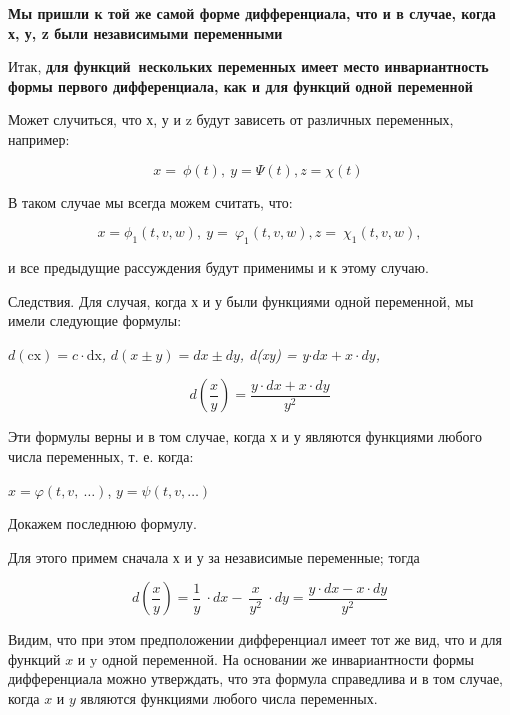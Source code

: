 \textbf{Мы пришли к той же самой форме дифференциала, что и в случае,
когда х, у, z были независимыми переменными}

Итак, \textbf{для функций~нескольких переменных имеет место
инвариантность формы первого дифференциала, как и для функций одной
переменной}

Может случиться, что х, у и z будут зависеть от различных переменных,
например:

$$ x = \ \phi\left( t \right),\ y = \Psi\left( t \right),z = \chi(t)\  $$

В таком случае мы всегда можем считать, что:

$$ x = \phi_{1}\left( t,v,w \right),\ {y = \ \varphi}_{1}\left( t,v,w \right),{z = \ \chi}_{1}\left( t,v,w \right), $$

и все предыдущие рассуждения будут применимы и к этому случаю.

Следствия. Для случая, когда х и у были функциями одной переменной, мы
имели следующие формулы:

$ d\left( \text{cx} \right) = c \cdot \text{dx} $\emph{,}
$ d\left( x \pm y \right) = dx \pm dy $\emph{, d(xy) =
y}$ \cdot dx + x \cdot dy $\emph{,}

$$ d\left( \frac{x}{y} \right) = \frac{y \cdot dx + x \cdot dy}{y^{2}} $$

Эти формулы верны и в том случае, когда х и у являются функциями любого
числа переменных, т. е. когда:

$ x = \varphi(t,v,\ \ldots) $, $ y = \psi(t,v,\ldots) $

Докажем последнюю формулу.

Для этого примем сначала х и у за независимые переменные; тогда

$$ d\left( \frac{x}{y} \right) = \frac{1}{y}\  \cdot dx - \ \frac{x}{y^{2}}\  \cdot dy = \frac{y \cdot dx - x \cdot dy}{y^{2}} $$

Видим, что при этом предположении дифференциал имеет тот же вид, что и
для функций $ x $ и $ \text{y\ } $одной переменной. На основании же
инвариантности формы дифференциала можно утверждать, что эта формула
справедлива и в том случае, когда $ x $ и $ y $ являются функциями
любого числа переменных.

